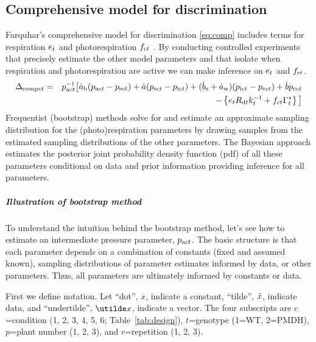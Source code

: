 \documentclass[12pt]{article}
\begin{document}
\subsection{Comprehensive model for discrimination}

Farquhar's comprehensive model for discrimination \eqref{eq:comp}
  includes terms for respiration $e_{t}$ and photorespiration $f_{ct}$ \citep{farquhar1982stomatal,farquhar1984isotopic}.
By conducting controlled experiments that
  precisely estimate the other model parameters
  and that isolate when respiration and photorespiration are active
  we can make inference on $e_{t}$ and $f_{ct}$.
\begin{eqnarray}
  \sDeltacomp
    & = &
  \spa^{-1}
    \big\lbrack
      \sdotab(\spa-\sps)+\sdota(\sps-\spi)+(\sdotbs+\sdotaw)(\spi-\spc) + \sdotb\spc
\nonumber\\ %
    &&
    \qquad
      -
      \left\lbrace
        \sse\sRd\ssk^{-1} + \ssf\sGammastar
      \right\rbrace
    \big\rbrack
\label{eq:comp}
\end{eqnarray}
Frequentist (bootstrap) methods solve for and estimate an approximate sampling distribution for
  the (photo)respiration parameters by drawing samples from the
  estimated sampling distributions of the other parameters.
The Bayesian approach estimates the posterior joint probability density function (pdf)
  of all these parameters
  conditional on data and prior information
  providing inference for all parameters.

\subparagraph{Illustration of bootstrap method}
To understand the intuition behind the bootstrap method,
  let's see how to estimate an intermediate pressure parameter, $p_{\textrm{a}ct}$.
The basic structure is that each parameter depends on a combination of
  constants (fixed and assumed known),
  sampling distributions of parameter estimates informed by data,
  or other parameters.
Thus, all parameters are ultimately informed by constants or data.

First we define notation.
Let ``dot'', $\dot{x}$, indicate a constant,
  ``tilde'', $\tilde{x}$, indicate data, and
  ``undertilde'', $\vector{x}$, indicate a vector.
The four subscripts are
  $c$=condition (1, 2, 3, 4, 5, 6; Table~\ref{tab:design}),
  $t$=genotype (1=WT, 2=PMDH),
  $p$=plant number (1, 2, 3), and
  $r$=repetition (1, 2, 3).
\end{document}
